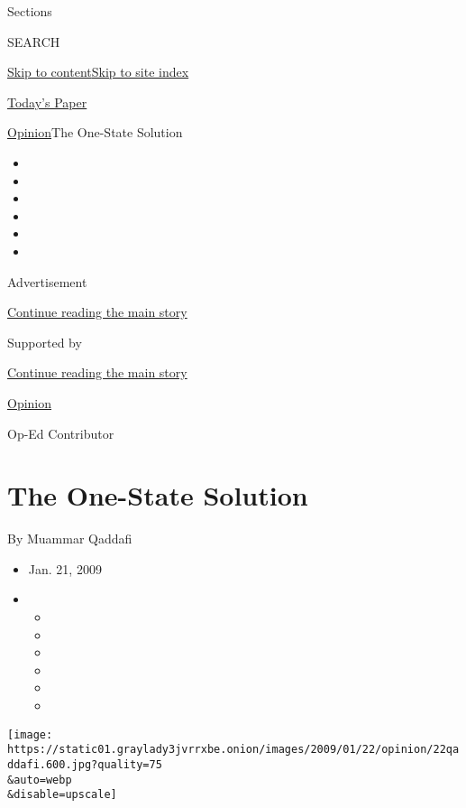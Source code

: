 Sections

SEARCH

\protect\hyperlink{site-content}{Skip to
content}\protect\hyperlink{site-index}{Skip to site index}

\href{https://myaccount.nytimes3xbfgragh.onion/auth/login?response_type=cookie\&client_id=vi}{}

\href{https://www.nytimes3xbfgragh.onion/section/todayspaper}{Today's
Paper}

\href{/section/opinion}{Opinion}\textbar{}The One-State Solution

\begin{itemize}
\item
\item
\item
\item
\item
\item
\end{itemize}

Advertisement

\protect\hyperlink{after-top}{Continue reading the main story}

Supported by

\protect\hyperlink{after-sponsor}{Continue reading the main story}

\href{/section/opinion}{Opinion}

Op-Ed Contributor

\hypertarget{the-one-state-solution}{%
\section{The One-State Solution}\label{the-one-state-solution}}

By Muammar Qaddafi

\begin{itemize}
\item
  Jan. 21, 2009
\item
  \begin{itemize}
  \item
  \item
  \item
  \item
  \item
  \item
  \end{itemize}
\end{itemize}

\texttt{[image: https://static01.graylady3jvrrxbe.onion/images/2009/01/22/opinion/22qaddafi.600.jpg?quality=75\\\&auto=webp\\\&disable=upscale]}


